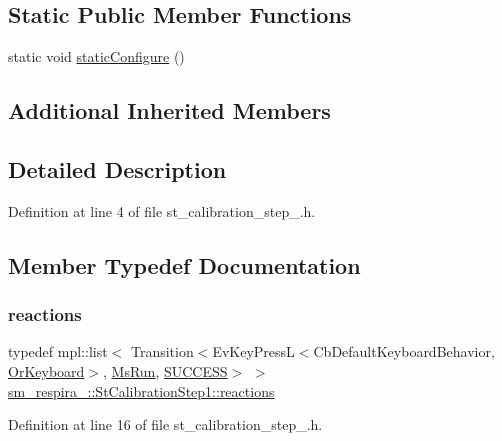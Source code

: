 \subsection*{Static Public Member Functions}
\begin{DoxyCompactItemize}
\item 
static void \hyperlink{structsm__respira__1_1_1StCalibrationStep1_a2e817276acf8ab351121f8459e00b0f2}{static\+Configure} ()
\end{DoxyCompactItemize}
\subsection*{Additional Inherited Members}


\subsection{Detailed Description}


Definition at line 4 of file st\+\_\+calibration\+\_\+step\+\_.\+h.



\subsection{Member Typedef Documentation}
\mbox{\label{structsm__respira__1_1_1StCalibrationStep1_ade778f0068577bb0ac7ad180e665983a}} 
\subsubsection{\texorpdfstring{reactions}{reactions}}
{\footnotesize\ttfamily typedef mpl\+::list$<$ Transition$<$Ev\+Key\+PressL$<$Cb\+Default\+Keyboard\+Behavior, \hyperlink{classsm__respira__1_1_1OrKeyboard}{Or\+Keyboard}$>$, \hyperlink{classsm__respira__1_1_1MsRun}{Ms\+Run}, \hyperlink{classSUCCESS}{S\+U\+C\+C\+E\+SS}$>$ $>$ \hyperlink{structsm__respira__1_1_1StCalibrationStep1_ade778f0068577bb0ac7ad180e665983a}{sm\+\_\+respira\+\_\+::\+St\+Calibration\+Step1\+::reactions}}



Definition at line 16 of file st\+\_\+calibration\+\_\+step\+\_.\+h.




